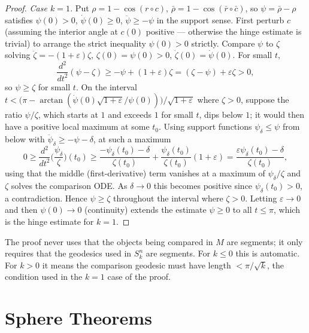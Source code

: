 \begin{proof}
  \emph{Case $k=1$.} Put $\rho=1-\cos(r\circ c)$,
  $\bar\rho=1-\cos(\bar r\circ\bar c)$, so $\psi=\bar\rho-\rho$ satisfies
  $\psi(0)>0$, $\dot\psi(0)\ge0$, $\ddot\psi\ge-\psi$ in the support sense. First
  perturb $c$ (assuming the interior angle at $c(0)$ positive — otherwise the
  hinge estimate is trivial) to arrange the strict inequality $\psi(0)>0$
  strictly. Compare $\psi$ to $\zeta$ solving
  $\ddot\zeta=-(1+\varepsilon)\zeta$, $\zeta(0)=\psi(0)>0$,
  $\dot\zeta(0)=\dot\psi(0)$. For small $t$,
  \[
    \frac{d^2}{dt^2}(\psi-\zeta)\ge-\psi+(1+\varepsilon)\zeta=(\zeta-\psi)+\varepsilon\zeta>0,
  \]
  so $\psi\ge\zeta$ for small $t$. On the interval
  $t<\big(\pi-\arctan(\dot\psi(0)\sqrt{1+\varepsilon}/\psi(0))\big)/\sqrt{1+\varepsilon}$
  where $\zeta>0$, suppose the ratio $\psi/\zeta$, which starts at $1$ and
  exceeds $1$ for small $t$, dips below $1$; it would then have a positive local
  maximum at some $t_0$. Using support functions $\psi_\delta\le\psi$ from below
  with $\ddot\psi_\delta\ge-\psi-\delta$, at such a maximum
  \[
    0\ge\frac{d^2}{dt^2}\Big(\frac{\psi_\delta}{\zeta}\Big)(t_0)
    \ge\frac{-\psi_\delta(t_0)-\delta}{\zeta(t_0)}+\frac{\psi_\delta(t_0)}{\zeta(t_0)}(1+\varepsilon)
    =\frac{\varepsilon\psi_\delta(t_0)-\delta}{\zeta(t_0)},
  \]
  using that the middle (first-derivative) term vanishes at a maximum of
  $\psi_\delta/\zeta$ and $\zeta$ solves the comparison ODE. As $\delta\to0$
  this becomes positive since $\psi_\delta(t_0)>0$, a contradiction. Hence
  $\psi\ge\zeta$ throughout the interval where $\zeta>0$. Letting
  $\varepsilon\to0$ and then $\psi(0)\to0$ (continuity) extends the estimate
  $\psi\ge0$ to all $t\le\pi$, which is the hinge estimate for $k=1$.
\end{proof}

\begin{remark}
  \label{rem:pet-ch12-toponogov-segment-remark}
  The proof never uses that the objects being compared in $M$ are segments; it
  only requires that the geodesics used in $S_k^n$ are segments. For $k\le0$
  this is automatic. For $k>0$ it means the comparison geodesic must have length
  $<\pi/\sqrt k$, the condition used in the $k=1$ case of the proof.
\end{remark}

\section{Sphere Theorems}

